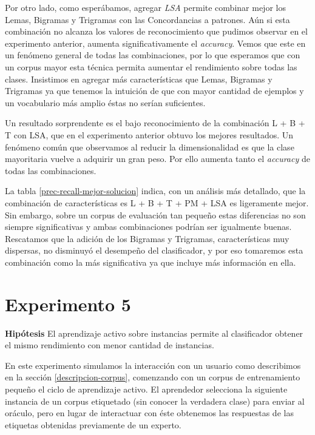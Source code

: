 Por otro lado, como esperábamos, agregar \textit{LSA} permite combinar mejor los Lemas, Bigramas y Trigramas con las Concordancias a patrones. Aún si esta combinación no alcanza los valores de reconocimiento que pudimos observar en el experimento anterior, aumenta significativamente el \textit{accuracy}. Vemos que este en un fenómeno general de todas las combinaciones, por lo que esperamos que con un corpus mayor esta técnica permita aumentar el rendimiento sobre todas las clases. Insistimos en agregar más características que Lemas, Bigramas y Trigramas ya que tenemos la intuición de que con mayor cantidad de ejemplos y un vocabulario más amplio éstas no serían suficientes.

Un resultado sorprendente es el bajo reconocimiento de la combinación L + B + T con LSA, que en el experimento anterior obtuvo los mejores resultados. Un fenómeno común que observamos al reducir la dimensionalidad es que la clase mayoritaria vuelve a adquirir un gran peso. Por ello aumenta tanto el \textit{accuracy} de todas las combinaciones.

La tabla \ref{prec-recall-mejor-solucion} indica, con un análisis más detallado, que la combinación de características es L + B + T + PM + LSA es ligeramente mejor. Sin embargo, sobre un corpus de evaluación tan pequeño estas diferencias no son siempre significativas y ambas combinaciones podrían ser igualmente buenas. Rescatamos que la adición de los Bigramas y Trigramas, características muy dispersas, no disminuyó el desempeño del clasificador, y por eso tomaremos esta combinación como la más significativa ya que incluye más información en ella.

\section{Experimento 5}\label{experimento-aa-instancias}
\vspace{3 mm}
\textbf{Hipótesis} El aprendizaje activo sobre instancias permite al clasificador obtener el mismo rendimiento con menor cantidad de instancias.
\vspace{3 mm}

En este experimento simulamos la interacción con un usuario como describimos en la sección \ref{descripcion-corpus}, comenzando con un corpus de entrenamiento pequeño el ciclo de aprendizaje activo. El aprendedor selecciona la siguiente instancia de un corpus etiquetado (sin conocer la verdadera clase) para enviar al oráculo, pero en lugar de interactuar con éste obtenemos las respuestas de las etiquetas obtenidas previamente de un experto.

